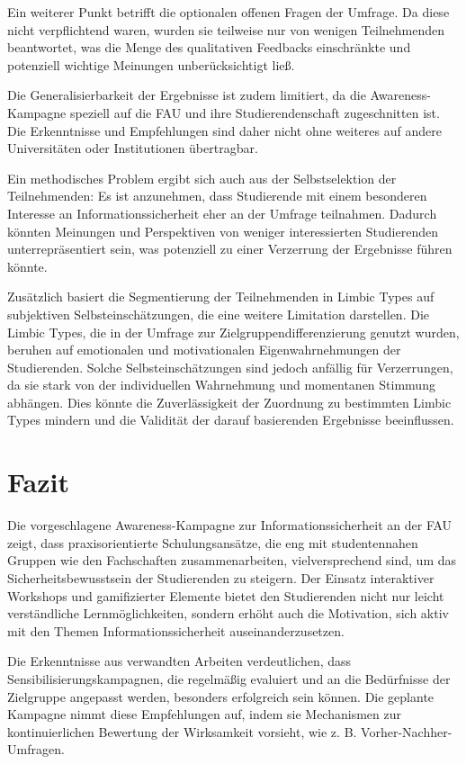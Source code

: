 \documentclass[german,report]{i1thesis}
\begin{document}
Ein weiterer Punkt betrifft die optionalen offenen Fragen der Umfrage. Da diese nicht verpflichtend waren, wurden sie teilweise nur von wenigen Teilnehmenden beantwortet, was die Menge des qualitativen Feedbacks einschränkte und potenziell wichtige Meinungen unberücksichtigt ließ.

Die Generalisierbarkeit der Ergebnisse ist zudem limitiert, da die Awareness-Kampagne speziell auf die FAU und ihre Studierendenschaft zugeschnitten ist. Die Erkenntnisse und Empfehlungen sind daher nicht ohne weiteres auf andere Universitäten oder Institutionen übertragbar.

Ein methodisches Problem ergibt sich auch aus der Selbstselektion der Teilnehmenden: Es ist anzunehmen, dass Studierende mit einem besonderen Interesse an Informationssicherheit eher an der Umfrage teilnahmen. Dadurch könnten Meinungen und Perspektiven von weniger interessierten Studierenden unterrepräsentiert sein, was potenziell zu einer Verzerrung der Ergebnisse führen könnte.

Zusätzlich basiert die Segmentierung der Teilnehmenden in Limbic Types auf subjektiven Selbsteinschätzungen, die eine weitere Limitation darstellen. Die Limbic Types, die in der Umfrage zur Zielgruppendifferenzierung genutzt wurden, beruhen auf emotionalen und motivationalen Eigenwahrnehmungen der Studierenden. Solche Selbsteinschätzungen sind jedoch anfällig für Verzerrungen, da sie stark von der individuellen Wahrnehmung und momentanen Stimmung abhängen. Dies könnte die Zuverlässigkeit der Zuordnung zu bestimmten Limbic Types mindern und die Validität der darauf basierenden Ergebnisse beeinflussen.

\section{Fazit}
\label{sec:conclusion}

Die vorgeschlagene Awareness-Kampagne zur Informationssicherheit an der FAU zeigt, dass praxisorientierte Schulungsansätze, die eng mit studentennahen Gruppen wie den Fachschaften zusammenarbeiten, vielversprechend sind, um das Sicherheitsbewusstsein der Studierenden zu steigern. Der Einsatz interaktiver Workshops und gamifizierter Elemente bietet den Studierenden nicht nur leicht verständliche Lernmöglichkeiten, sondern erhöht auch die Motivation, sich aktiv mit den Themen Informationssicherheit auseinanderzusetzen.

Die Erkenntnisse aus verwandten Arbeiten verdeutlichen, dass Sensibilisierungskampagnen, die regelmäßig evaluiert und an die Bedürfnisse der Zielgruppe angepasst werden, besonders erfolgreich sein können. Die geplante Kampagne nimmt diese Empfehlungen auf, indem sie Mechanismen zur kontinuierlichen Bewertung der Wirksamkeit vorsieht, wie z. B. Vorher-Nachher-Umfragen.
\end{document}
